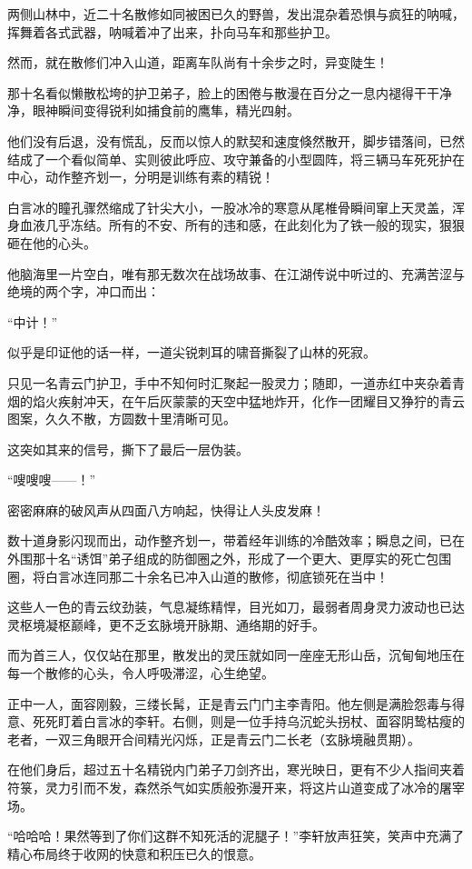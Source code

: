两侧山林中，近二十名散修如同被困已久的野兽，发出混杂着恐惧与疯狂的呐喊，挥舞着各式武器，呐喊着冲了出来，扑向马车和那些护卫。

然而，就在散修们冲入山道，距离车队尚有十余步之时，异变陡生！

那十名看似懒散松垮的护卫弟子，脸上的困倦与散漫在百分之一息内褪得干干净净，眼神瞬间变得锐利如捕食前的鹰隼，精光四射。

他们没有后退，没有慌乱，反而以惊人的默契和速度倏然散开，脚步错落间，已然结成了一个看似简单、实则彼此呼应、攻守兼备的小型圆阵，将三辆马车死死护在中心，动作整齐划一，分明是训练有素的精锐！

白言冰的瞳孔骤然缩成了针尖大小，一股冰冷的寒意从尾椎骨瞬间窜上天灵盖，浑身血液几乎冻结。所有的不安、所有的违和感，在此刻化为了铁一般的现实，狠狠砸在他的心头。

他脑海里一片空白，唯有那无数次在战场故事、在江湖传说中听过的、充满苦涩与绝境的两个字，冲口而出：

“中计！”

似乎是印证他的话一样，一道尖锐刺耳的啸音撕裂了山林的死寂。

只见一名青云门护卫，手中不知何时汇聚起一股灵力；随即，一道赤红中夹杂着青烟的焰火疾射冲天，在午后灰蒙蒙的天空中猛地炸开，化作一团耀目又狰狞的青云图案，久久不散，方圆数十里清晰可见。

这突如其来的信号，撕下了最后一层伪装。

“嗖嗖嗖——！”

密密麻麻的破风声从四面八方响起，快得让人头皮发麻！

数十道身影闪现而出，动作整齐划一，带着经年训练的冷酷效率；瞬息之间，已在外围那十名“诱饵”弟子组成的防御圈之外，形成了一个更大、更厚实的死亡包围圈，将白言冰连同那二十余名已冲入山道的散修，彻底锁死在当中！

这些人一色的青云纹劲装，气息凝练精悍，目光如刀，最弱者周身灵力波动也已达灵枢境凝枢巅峰，更不乏玄脉境开脉期、通络期的好手。

而为首三人，仅仅站在那里，散发出的灵压就如同一座座无形山岳，沉甸甸地压在每一个散修的心头，令人呼吸滞涩，心生绝望。

正中一人，面容刚毅，三缕长髯，正是青云门门主李青阳。他左侧是满脸怨毒与得意、死死盯着白言冰的李轩。右侧，则是一位手持乌沉蛇头拐杖、面容阴鸷枯瘦的老者，一双三角眼开合间精光闪烁，正是青云门二长老（玄脉境融贯期）。

在他们身后，超过五十名精锐内门弟子刀剑齐出，寒光映日，更有不少人指间夹着符箓，灵力引而不发，森然杀气如实质般弥漫开来，将这片山道变成了冰冷的屠宰场。

“哈哈哈！果然等到了你们这群不知死活的泥腿子！”李轩放声狂笑，笑声中充满了精心布局终于收网的快意和积压已久的恨意。

